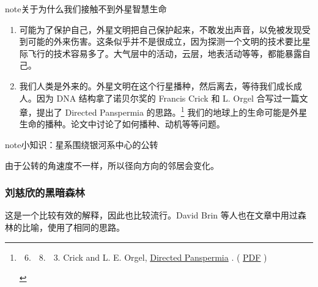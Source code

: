 \documentclass[letterpaper,10pt,english]{sphinxmanual}
\begin{document}
\begin{notice}{note}{关于为什么我们接触不到外星智慧生命}
\begin{enumerate}
\item {} 
可能为了保护自己，外星文明把自己保护起来，不敢发出声音，以免被发现受到可能的外来伤害。这条似乎并不是很成立，因为探测一个文明的技术要比星际飞行的技术容易多了。大气层中的活动，云层，地表活动等等，都能暴露自己。

\item {} 
我们人类是外来的。外星文明在这个行星播种，然后离去，等待我们成长成人。因为 DNA 结构拿了诺贝尔奖的 Francis Crick 和 L. Orgel 合写过一篇文章，提出了 Directed Panspermia 的思路。\footnote{\begin{enumerate}
\setcounter{enumi}{5}
\item {} \begin{enumerate}
\setcounter{enumi}{7}
\item {} \begin{enumerate}
\setcounter{enumi}{2}
\item {} 
Crick and L. E. Orgel, \href{http://www.sciencedirect.com/science/article/pii/0019103573901103}{Directed Panspermia} . ( \href{http://profiles.nlm.nih.gov/ps/access/SCBCCP.pdf}{PDF} )

\end{enumerate}

\end{enumerate}

\end{enumerate}
} 我们的地球上的生命可能是外星生命的播种。论文中讨论了如何播种、动机等等问题。

\end{enumerate}
\end{notice}

\begin{notice}{note}{小知识：星系围绕银河系中心的公转}

由于公转的角速度不一样，所以径向方向的邻居会变化。
\end{notice}


\subsubsection{刘慈欣的黑暗森林}
\label{fermi:id5}
这是一个比较有效的解释，因此也比较流行。David Brin 等人也在文章中用过森林的比喻，使用了相同的思路。
\end{document}
